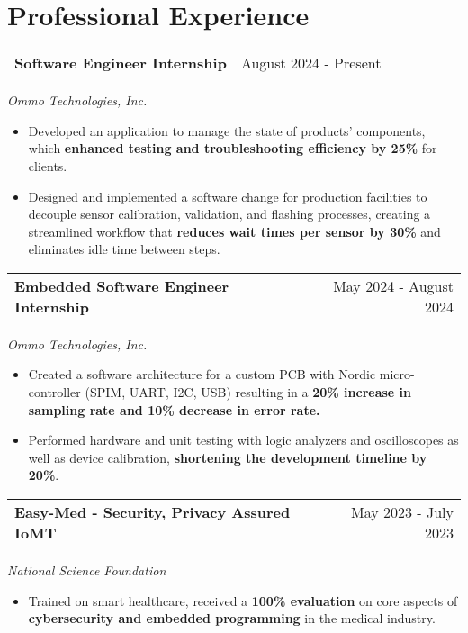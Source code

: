 \documentclass[a4paper,12pt]{article}
\begin{document}
\vspace{-0.7em}
\section{Professional Experience}

\begin{tabularx}{\linewidth}{@{}Xr@{}}
\textbf{Software Engineer Internship} & \hfill August 2024 - Present
\end{tabularx}
\textit{Ommo Technologies, Inc.}
\vspace{-0.4em}
\begin{itemize}[leftmargin=*, noitemsep, topsep=0pt]
    \item Developed an application to manage the state of products' components, which \textbf{enhanced testing and troubleshooting efficiency by 25\%} for clients.
    \item Designed and implemented a software change for production facilities to decouple sensor calibration, validation, and flashing processes, creating a streamlined workflow that \textbf{reduces wait times per sensor by 30\%} and eliminates idle time between steps.
    
\end{itemize}

\begin{tabularx}{\linewidth}{@{}Xr@{}}
\textbf{Embedded Software Engineer Internship} & \hfill May 2024 - August 2024
\end{tabularx}
\textit{Ommo Technologies, Inc.}
\vspace{-0.4em}
\begin{itemize}[leftmargin=*, nosep]    
    \item Created a software architecture for a custom PCB with Nordic micro-controller (SPIM, UART, I2C, USB) resulting in a \textbf{20\% increase in sampling rate and 10\% decrease in error rate.}
    \item Performed hardware and unit testing with logic analyzers and oscilloscopes as well as device calibration, \textbf{shortening the development timeline by 20\%}.
\end{itemize}

\begin{tabularx}{\linewidth}{@{}Xr@{}}
\textbf{Easy-Med - Security, Privacy Assured IoMT} & \hfill May 2023 - July 2023
\end{tabularx}
\textit{National Science Foundation}
\vspace{-0.4em}
\begin{itemize}[leftmargin=*, nosep]
    \item Trained on smart healthcare, received a \textbf{100\% evaluation} on core aspects of \textbf{cybersecurity and embedded programming} in the medical industry.
\end{itemize}
\end{document}

